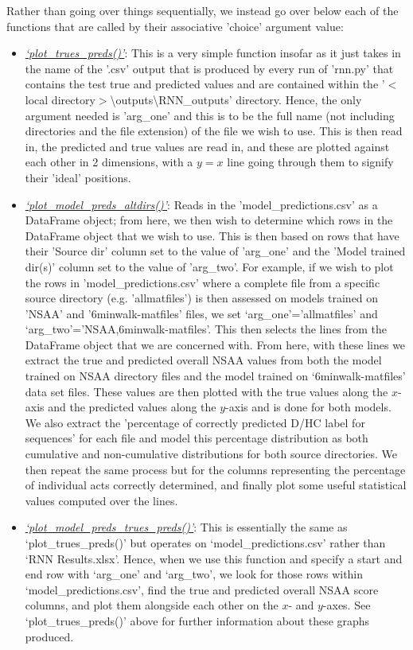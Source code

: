 \documentclass[12pt,twoside]{report}
\begin{document}
\quad Rather than going over things sequentially, we instead go over below each of the functions that are called by their associative 'choice' argument value:

\begin{itemize}
	\item \underline{\textit{‘plot\_trues\_preds()’}}: This is a very simple function insofar as it just takes in the name of the '.csv' output that is produced by every run of 'rnn.py' that contains the test true and predicted values and are contained within the '$<$local directory$>$\textbackslash outputs\textbackslash RNN\_outputs' directory. Hence, the only argument needed is 'arg\_one' and this is to be the full name (not including directories and the file extension) of the file we wish to use. This is then read in, the predicted and true values are read in, and these are plotted against each other in 2 dimensions, with a $y=x$ line going through them to signify their 'ideal' positions.
	\item \underline{\textit{‘plot\_model\_preds\_altdirs()’}}: Reads in the 'model\_predictions.csv' as a DataFrame object; from here, we then wish to determine which rows in the DataFrame object that we wish to use. This is then based on rows that have their 'Source dir' column set to the value of 'arg\_one' and the 'Model trained dir(s)' column set to the value of 'arg\_two'. For example, if we wish to plot the rows in 'model\_predictions.csv' where a complete file from a specific source directory (e.g. 'allmatfiles') is then assessed on models trained on 'NSAA' and '6minwalk-matfiles' files, we set ‘arg\_one’='allmatfiles' and ‘arg\_two’='NSAA,6minwalk-matfiles'. This then selects the lines from the DataFrame object that we are concerned with. From here, with these lines we extract the true and predicted overall NSAA values from both the model trained on NSAA directory files and the model trained on ‘6minwalk-matfiles’ data set files. These values are then plotted with the true values along the $x$-axis and the predicted values along the $y$-axis and is done for both models. We also extract the 'percentage of correctly predicted D/HC label for sequences' for each file and model this percentage distribution as both cumulative and non-cumulative distributions for both source directories. We then repeat the same process but for the columns representing the percentage of individual acts correctly determined, and finally plot some useful statistical values computed over the lines.
	\item \underline{\textit{‘plot\_model\_preds\_trues\_preds()’}}: This is essentially the same as ‘plot\_trues\_preds()’ but operates on ‘model\_predictions.csv’ rather than ‘RNN Results.xlsx’. Hence, when we use this function and specify a start and end row with ‘arg\_one’ and ‘arg\_two’, we look for those rows within ‘model\_predictions.csv’, find the true and predicted overall NSAA score columns, and plot them alongside each other on the $x$- and $y$-axes. See ‘plot\_trues\_preds()’ above for further information about these graphs produced.

\end{itemize}
\end{document}
